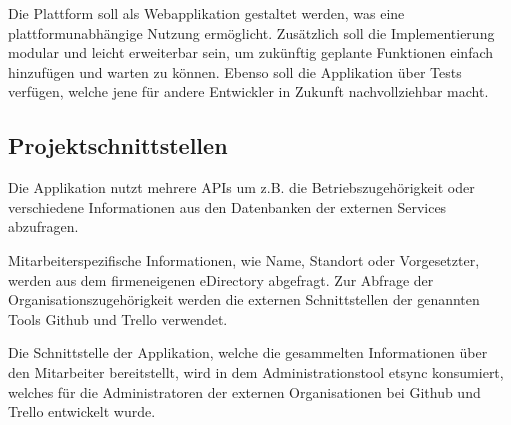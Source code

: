 Die Plattform soll als Webapplikation gestaltet werden, was eine plattformunabhängige Nutzung
ermöglicht. Zusätzlich soll die Implementierung modular und leicht erweiterbar sein, um zukünftig
geplante Funktionen einfach hinzufügen und warten zu können. Ebenso soll die Applikation über Tests
verfügen, welche jene für andere Entwickler in Zukunft nachvollziehbar macht.

\subsection{Projektschnittstellen}
\label{sec:Projektschnittstellen}
Die Applikation nutzt mehrere APIs um z.B. die Betriebszugehörigkeit oder verschiedene Informationen
aus den Datenbanken der externen Services abzufragen.

Mitarbeiterspezifische Informationen, wie Name, Standort oder Vorgesetzter, werden aus dem
firmeneigenen eDirectory abgefragt.
Zur Abfrage der Organisationszugehörigkeit werden die externen Schnittstellen der genannten Tools
Github und Trello verwendet.

Die Schnittstelle der Applikation, welche die gesammelten Informationen über den Mitarbeiter
bereitstellt, wird in dem Administrationstool etsync konsumiert, welches für die Administratoren
der externen Organisationen bei Github und Trello entwickelt wurde.
